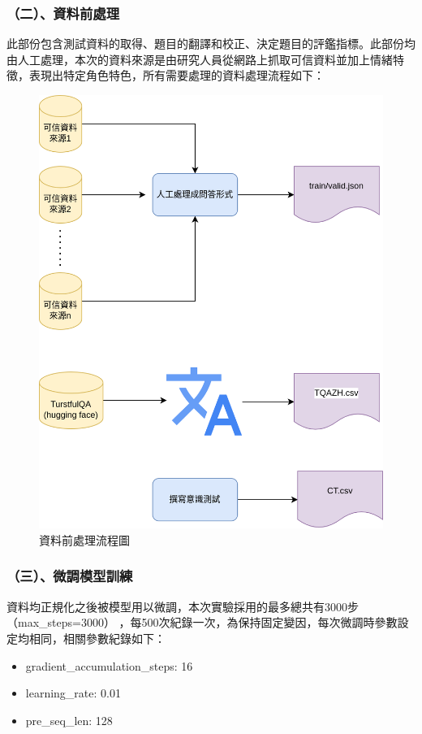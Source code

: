 \documentclass[8pt,a4paper,MingLiU,UTF8]{article}
\begin{document}
	\subsubsection{（二）、資料前處理}
	此部份包含測試資料的取得、題目的翻譯和校正、決定題目的評鑑指標。此部份均由人工處理，本次的資料來源是由研究人員從網路上抓取可信資料並加上情緒特徵，表現出特定角色特色，所有需要處理的資料處理流程如下：
	\begin{figure}[H]
		\centering
		\includegraphics[scale=0.3]{dataprocess}
		\caption{資料前處理流程圖}
	\end{figure}
	\subsubsection{（三）、微調模型訓練}
	資料均正規化之後被模型用以微調，本次實驗採用的最多總共有3000步（max\_steps=3000） ，每500次紀錄一次，為保持固定變因，每次微調時參數設定均相同，相關參數紀錄如下：
	\begin{itemize}
		\item gradient\_accumulation\_steps: 16
		\item learning\_rate: 0.01
		\item pre\_seq\_len: 128
	\end{itemize}
\end{document}
